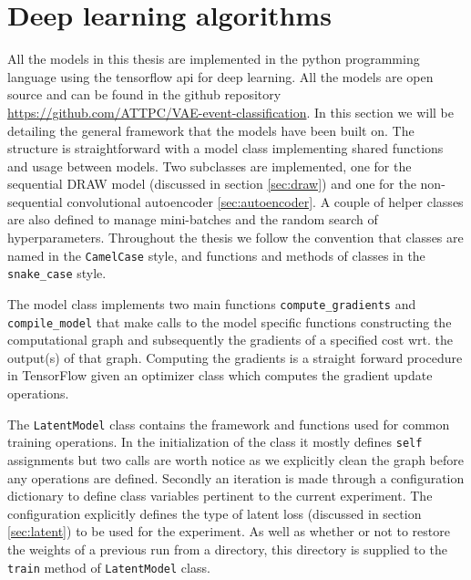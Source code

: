 \section{Deep learning algorithms}

All the models in this thesis are implemented in the python programming language using the tensorflow api for deep learning. All the models are open source and can be found in the github repository \url{https://github.com/ATTPC/VAE-event-classification}. In this section we will be detailing the general framework that the models have been built on. The structure is straightforward with a model class implementing shared functions and usage between models. Two subclasses are implemented, one for the sequential DRAW model (discussed in section \ref{sec:draw}) and one for the non-sequential convolutional autoencoder \ref{sec:autoencoder}. A couple of helper classes are also defined to manage mini-batches and the random search of hyperparameters. Throughout the thesis we follow the convention that classes are named in the \lstinline{CamelCase} style, and functions and methods of classes in the \lstinline{snake_case} style.  

The model class implements two main functions \lstinline{compute_gradients} and \lstinline{compile_model} that make calls to the model specific functions constructing the computational graph and subsequently the gradients of a specified cost wrt. the output(s) of that graph. Computing the gradients is a straight forward procedure in TensorFlow given an optimizer class which computes the gradient update operations. 

The \lstinline{LatentModel} class contains the framework and functions used for common training operations. In the initialization of the class it mostly defines \lstinline{self} assignments but two calls are worth notice as we explicitly clean the graph before any operations are defined. Secondly an iteration is made through a configuration dictionary to define class variables pertinent to the current experiment. The configuration explicitly defines the type of latent loss (discussed in section \ref{sec:latent}) to be used for the experiment. As well as whether or not to restore the weights of a previous run from a directory, this directory is supplied to the \lstinline{train} method of \lstinline{LatentModel} class. 

% 

